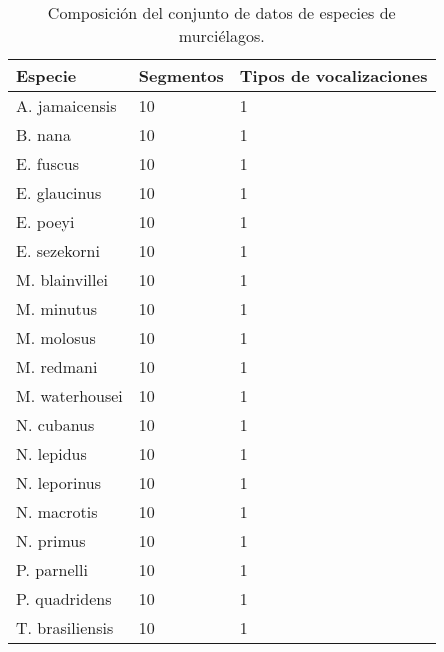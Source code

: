 \begin{table}[h]
    \centering
    \begin{tabular}{lll}
        \hline
        Especie & Segmentos & Tipos de vocalizaciones   \\ \hline
        A. jamaicensis & 10 & 1                         \\
        B. nana & 10 & 1                                \\
        E. fuscus & 10 & 1                              \\
        E. glaucinus & 10 & 1                           \\
        E. poeyi & 10 & 1                               \\
        E. sezekorni & 10 & 1                           \\
        M. blainvillei & 10 & 1                         \\
        M. minutus & 10 & 1                             \\
        M. molosus & 10 & 1                             \\
        M. redmani & 10 & 1                             \\
        M. waterhousei & 10 & 1                         \\
        N. cubanus & 10 & 1                             \\
        N. lepidus & 10 & 1                             \\
        N. leporinus & 10 & 1                           \\
        N. macrotis & 10 & 1                            \\
        N. primus & 10 & 1                              \\
        P. parnelli & 10 & 1                            \\
        P. quadridens & 10 & 1                          \\
        T. brasiliensis & 10 & 1
    \end{tabular}
    \caption{Composición del conjunto de datos de especies de murciélagos.}
    \label{table:bats}
\end{table}

